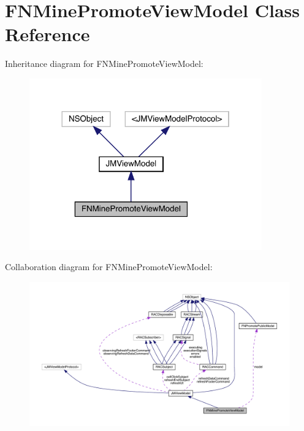 \hypertarget{interface_f_n_mine_promote_view_model}{}\section{F\+N\+Mine\+Promote\+View\+Model Class Reference}
\label{interface_f_n_mine_promote_view_model}


Inheritance diagram for F\+N\+Mine\+Promote\+View\+Model\+:\nopagebreak
\begin{figure}[H]
\begin{center}
\leavevmode
\includegraphics[width=284pt]{interface_f_n_mine_promote_view_model__inherit__graph}
\end{center}
\end{figure}


Collaboration diagram for F\+N\+Mine\+Promote\+View\+Model\+:\nopagebreak
\begin{figure}[H]
\begin{center}
\leavevmode
\includegraphics[width=350pt]{interface_f_n_mine_promote_view_model__coll__graph}
\end{center}
\end{figure}
